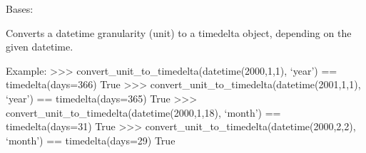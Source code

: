 \documentclass[letterpaper,10pt,english]{sphinxmanual}
\begin{document}
\begin{fulllineitems}
\label{\detokenize{pydash_app.dashboard.aggregator.aggregator_group:pydash_app.dashboard.aggregator.aggregator_group.AggregatorPartitionFun}}
Bases: 

\end{fulllineitems}


\begin{fulllineitems}
\label{\detokenize{pydash_app.dashboard.aggregator.aggregator_group:pydash_app.dashboard.aggregator.aggregator_group.calc_endpoint_call_identifier}}
\end{fulllineitems}


\begin{fulllineitems}
\label{\detokenize{pydash_app.dashboard.aggregator.aggregator_group:pydash_app.dashboard.aggregator.aggregator_group.convert_unit_to_timedelta}}
Converts a datetime granularity (unit) to a timedelta object, depending on the given datetime.

Example:
\textgreater{}\textgreater{}\textgreater{} convert\_unit\_to\_timedelta(datetime(2000,1,1), ‘year’) == timedelta(days=366)
True
\textgreater{}\textgreater{}\textgreater{} convert\_unit\_to\_timedelta(datetime(2001,1,1), ‘year’) == timedelta(days=365)
True
\textgreater{}\textgreater{}\textgreater{} convert\_unit\_to\_timedelta(datetime(2000,1,18), ‘month’) == timedelta(days=31)
True
\textgreater{}\textgreater{}\textgreater{} convert\_unit\_to\_timedelta(datetime(2000,2,2), ‘month’) == timedelta(days=29)
True

\end{fulllineitems}
\end{document}
